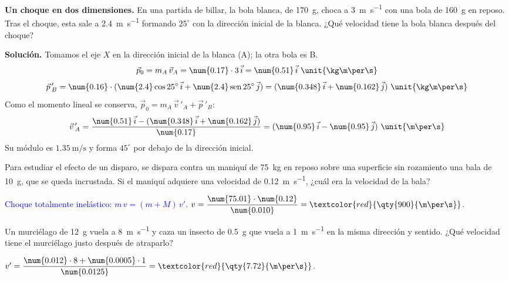 \begin{example}
    \textbf{Un choque en dos dimensiones.} En una partida de billar, la bola blanca, de \qty{170}{\g}, choca a \qty{3}{\m\per\s} con
    una bola de \qty{160}{\g} en reposo. Tras el choque, esta sale a \qty{2.4}{\m\per\s} formando \(25^\circ\) con la dirección
    inicial de la blanca. ¿Qué velocidad tiene la bola blanca después del choque?

    \textbf{Solución.} Tomamos el eje \(X\) en la dirección inicial de la blanca (A); la otra bola es B.
    \[ \vec{p}_0 = m_A\,\vec{v}_A = \num{0.17} \cdot 3\,\ivec = \num{0.51}\,\ivec~\unit{\kg\m\per\s} \]
    \[ \vec{p}\,'_B = \num{0.16} \cdot (\num{2.4}\cos 25^\circ\,\ivec + \num{2.4}\sen 25^\circ\,\jvec) = (\num{0.348}\,\ivec + \num{0.162}\,\jvec)~\unit{\kg\m\per\s} \]
    Como el momento lineal se conserva, \(\vec{p}_0 = m_A\,\vec{v}\,'_A + \vec{p}\,'_B\):
    \[ \vec{v}\,'_A = \frac{\num{0.51}\,\ivec - (\num{0.348}\,\ivec + \num{0.162}\,\jvec)}{\num{0.17}} = (\num{0.95}\,\ivec - \num{0.95}\,\jvec)~\unit{\m\per\s} \]
    Su módulo es \(\qty{1.35}{\m\per\s}\) y forma \(45^\circ\) por debajo de la dirección inicial.
\end{example}

\begin{exercise}
    Para estudiar el efecto de un disparo, se dispara contra un maniquí de \qty{75}{\kg} en reposo sobre una superficie sin
    rozamiento una bala de \qty{10}{\g}, que se queda incrustada. Si el maniquí adquiere una velocidad de \qty{0.12}{\m\per\s}, ¿cuál
    era la velocidad de la bala?
    \begin{solu}
        \textcolor{blue}{Choque totalmente inelástico: \(m\,v = (m + M)\,v'\).}
        \(v = \dfrac{\num{75.01} \cdot \num{0.12}}{\num{0.010}} = \textcolor{red}{\qty{900}{\m\per\s}}\).
    \end{solu}
\end{exercise}

\begin{exercise}
    Un murciélago de \qty{12}{\g} vuela a \qty{8}{\m\per\s} y caza un insecto de \qty{0.5}{\g} que vuela a \qty{1}{\m\per\s} en la
    misma dirección y sentido. ¿Qué velocidad tiene el murciélago justo después de atraparlo?
    \begin{solu}
        \(v' = \dfrac{\num{0.012} \cdot 8 + \num{0.0005} \cdot 1}{\num{0.0125}} = \textcolor{red}{\qty{7.72}{\m\per\s}}\).
    \end{solu}
\end{exercise}

